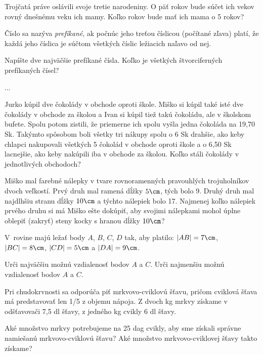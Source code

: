 {%
Trojčatá práve oslávili svoje tretie narodeniny. O päť rokov bude súčet ich vekov rovný
dnešnému veku ich mamy. Koľko rokov bude mať ich mama o 5 rokov?}

{%
Číslo sa nazýva {\it prefíkané}, ak počnúc jeho treťou číslicou (počítané zľava) platí, že každá
jeho číslica je súčtom všetkých číslic ležiacich naľavo od nej.
\begin{itemize}
 Napíšte dve najväčšie prefíkané čísla.
 Koľko je všetkých štvorciferných prefíkaných čísel?
\end{itemize}
}

{%
...}

{%
Jurko kúpil dve čokolády v obchode oproti škole. Miško si kúpil také isté dve čokolády
v obchode za školou a Ivan si kúpil tiež takú čokoládu, ale v školskom bufete. Spolu potom
zistili, že priemerne ich spolu vyšla jedna čokoláda na 19{,}70 Sk. Takýmto spôsobom boli
všetky tri nákupy spolu o 6 Sk drahšie, ako keby chlapci nakupovali všetkých 5 čokolád
v obchode oproti škole a o 6{,}50 Sk lacnejšie, ako keby nakúpili iba v obchode za školou.
Koľko stáli čokolády v jednotlivých obchodoch?}

{%
Miško mal farebné nálepky v tvare rovnoramenných pravouhlých trojuholníkov dvoch
veľkostí. Prvý druh mal ramená dĺžky $5\cm$, tých bolo 9. Druhý druh mal najdlhšiu stranu
dĺžky $10\cm$ a týchto nálepiek bolo 17. Najmenej koľko nálepiek prvého druhu si má Miško
ešte dokúpiť, aby svojimi nálepkami mohol úplne oblepiť (zakryť) steny kocky s hranou
dĺžky $10\cm$?}

{%
V~rovine majú ležať body $A$, $B$, $C$, $D$ tak, aby platilo: $|AB| = 7\cm$, $|BC| = 8\cm$, $|CD| = 5\cm$
a $|DA| = 9\cm$.
\begin{itemize}
 Urči najväčšiu možnú vzdialenosť bodov $A$ a $C$.
 Urči najmenšiu možnú vzdialenosť bodov $A$ a $C$.
\end{itemize}
}

{%
Pri chudokrvnosti sa odporúča piť mrkvovo-cviklovú šťavu, pričom cviklová šťava má
predstavovať len 1/5 z objemu nápoja. Z dvoch kg mrkvy získame v odšťavovači 7{,}5 dl šťavy,
z jedného kg cvikly 6 dl šťavy.
\begin{itemize}
 Aké množstvo mrkvy potrebujeme na 25 dag cvikly, aby sme získali správne
namiešanú mrkvovo-cviklovú šťavu?
 Aké množstvo mrkvovo-cviklovej šťavy takto získame?
\end{itemize}
}

